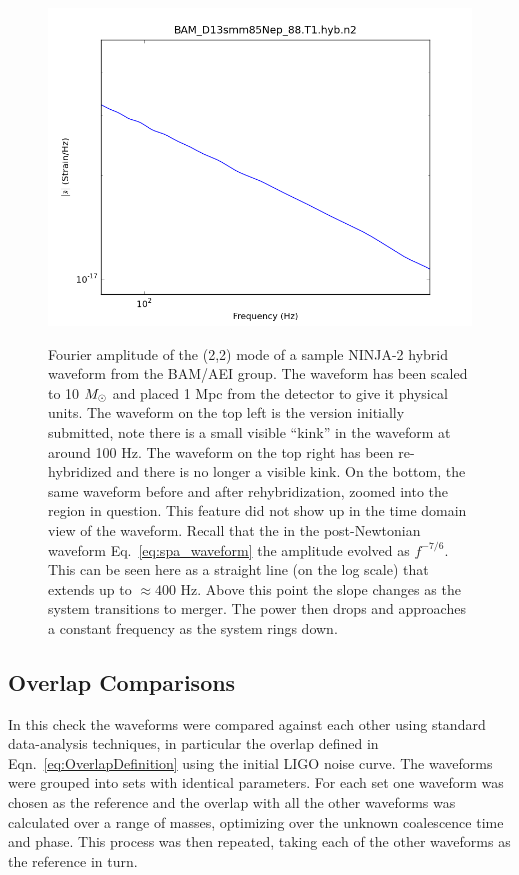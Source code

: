 \begin{figure}
  \includegraphics[width=0.5\linewidth]{figures/ninja2/BAM_D13smm85Nep_88_T1_hyb_n2_amp_new_zoom} \\
  \caption[Frequency-domain hybrid NINJA-2 waveforms]{
  \label{f:ninja2_freq_hybrids}
Fourier amplitude of the (2,2) mode of a sample NINJA-2 hybrid
waveform from the BAM/AEI group.  The waveform has been scaled to 10
$M_\odot$ and placed 1 Mpc from the detector to give it physical units.
The waveform on the top left is the version initially submitted, note
there is a small visible ``kink'' in the waveform at around 100 Hz.
The waveform on the top right has been re-hybridized and
there is no longer a visible kink.  On the bottom, the same waveform
before and after rehybridization, zoomed into the region in question.
This feature did not show up in the time domain view of the waveform.
Recall that the in the post-Newtonian waveform Eq.~\ref{eq:spa_waveform}
the amplitude evolved as $f^{-7/6}$.  This can be seen here as a
straight line (on the log scale) that extends up to $\approx
400$ Hz.  Above this point the slope changes as the system transitions
to merger.  The power then drops and approaches a constant frequency
as the system rings down.  
}
\end{figure}%


\subsection{Overlap Comparisons}
\label{ssec:ninja2_overlap_comparisons}

In this check the waveforms were compared against each other using
standard data-analysis techniques, in particular the overlap defined
in Eqn.~\ref{eq:OverlapDefinition}  using the initial LIGO noise
curve.  The waveforms were grouped into sets with identical
parameters.  For each set one waveform was chosen as the reference and
the overlap with all the other waveforms was calculated over a range of
masses, optimizing over the unknown coalescence time and phase. 
This process was then repeated, taking each of the other
waveforms as the reference in turn.


